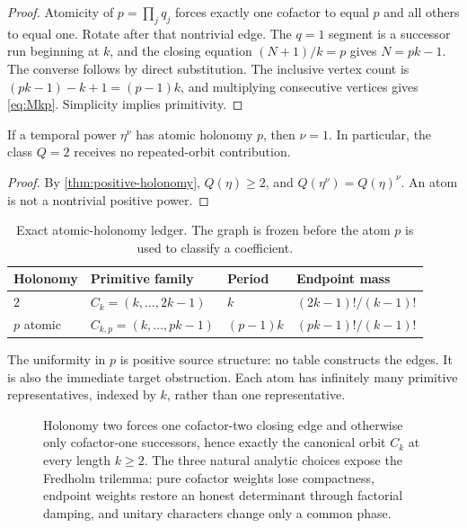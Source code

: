 \begin{proof}
Atomicity of \(p=\prod_jq_j\) forces exactly one cofactor to equal \(p\) and
all others to equal one.  Rotate after that nontrivial edge.  The \(q=1\)
segment is a successor run beginning at \(k\), and the closing equation
\((N+1)/k=p\) gives \(N=pk-1\).  The converse follows by direct substitution.
The inclusive vertex count is
\((pk-1)-k+1=(p-1)k\), and multiplying consecutive vertices gives
\cref{eq:Mkp}.  Simplicity implies primitivity.
\end{proof}

\begin{corollary}
\label{cor:no-atomic-repeat}
If a temporal power \(\eta^\nu\) has atomic holonomy \(p\), then
\(\nu=1\).  In particular, the class \(Q=2\) receives no repeated-orbit
contribution.
\end{corollary}

\begin{proof}
By \cref{thm:positive-holonomy}, \(Q(\eta)\ge2\), and
\(Q(\eta^\nu)=Q(\eta)^\nu\).  An atom is not a nontrivial positive power.
\end{proof}

\begin{table}[t]
\centering
\small
\caption{Exact atomic-holonomy ledger.  The graph is frozen before the atom
\(p\) is used to classify a coefficient.}
\label{tab:atomic-ledger}
\begin{tabular}{llll}
\toprule
Holonomy & Primitive family & Period & Endpoint mass \\
\midrule
\(2\) & \(C_k=(k,\ldots,2k-1)\) & \(k\) & \((2k-1)!/(k-1)!\) \\
\(p\) atomic & \(C_{k,p}=(k,\ldots,pk-1)\) & \((p-1)k\) & \((pk-1)!/(k-1)!\) \\
\bottomrule
\end{tabular}
\end{table}

The uniformity in \(p\) is positive source structure: no table constructs the
edges.  It is also the immediate target obstruction.  Each atom has
infinitely many primitive representatives, indexed by \(k\), rather than one
representative.

\begin{figure}[t]
\centering

\caption{Holonomy two forces one cofactor-two closing edge and otherwise only
cofactor-one successors, hence exactly the canonical orbit \(C_k\) at every
length \(k\ge2\).  The three natural analytic choices expose the Fredholm
trilemma: pure cofactor weights lose compactness, endpoint weights restore an
honest determinant through factorial damping, and unitary characters change
only a common phase.}
\label{fig:canonical-trilemma}
\end{figure}
